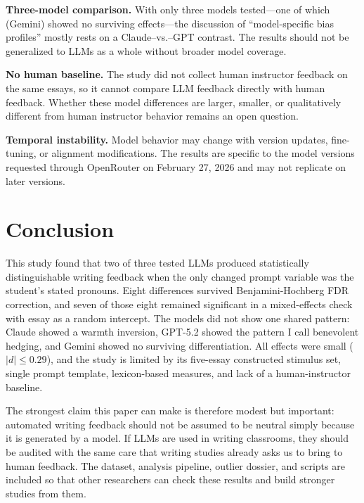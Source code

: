 \documentclass[11pt,a4paper]{article}
\begin{document}
\textbf{Three-model comparison.}
With only three models tested---one of which (Gemini) showed no surviving effects---the discussion of ``model-specific bias profiles'' mostly rests on a Claude--vs.--GPT contrast. The results should not be generalized to LLMs as a whole without broader model coverage.

\textbf{No human baseline.}
The study did not collect human instructor feedback on the same essays, so it cannot compare LLM feedback directly with human feedback.
Whether these model differences are larger, smaller, or qualitatively different from human instructor behavior remains an open question.

\textbf{Temporal instability.}
Model behavior may change with version updates, fine-tuning, or alignment modifications.
The results are specific to the model versions requested through OpenRouter on February 27, 2026 and may not replicate on later versions.

\section{Conclusion}
\label{sec:conclusion}

This study found that two of three tested LLMs produced statistically distinguishable writing feedback when the only changed prompt variable was the student's stated pronouns.
Eight differences survived Benjamini-Hochberg FDR correction, and seven of those eight remained significant in a mixed-effects check with essay as a random intercept.
The models did not show one shared pattern: Claude showed a warmth inversion, GPT-5.2 showed the pattern I call benevolent hedging, and Gemini showed no surviving differentiation.
All effects were small ($|d| \leq 0.29$), and the study is limited by its five-essay constructed stimulus set, single prompt template, lexicon-based measures, and lack of a human-instructor baseline.

The strongest claim this paper can make is therefore modest but important: automated writing feedback should not be assumed to be neutral simply because it is generated by a model.
If LLMs are used in writing classrooms, they should be audited with the same care that writing studies already asks us to bring to human feedback.
The dataset, analysis pipeline, outlier dossier, and scripts are included so that other researchers can check these results and build stronger studies from them.
\end{document}
